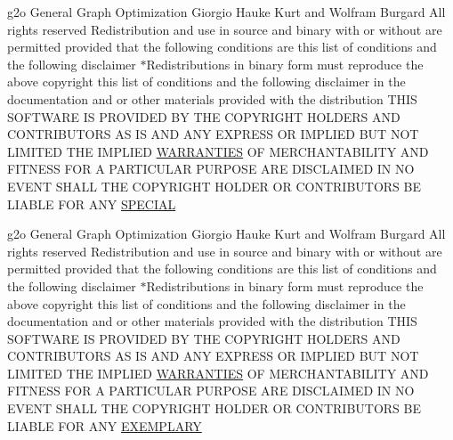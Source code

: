 \begin{DoxyCompactItemize}
g2o General Graph Optimization Giorgio Hauke Kurt and Wolfram Burgard All rights reserved Redistribution and use in source and binary with or without are permitted provided that the following conditions are this list of conditions and the following disclaimer $\ast$Redistributions in binary form must reproduce the above copyright this list of conditions and the following disclaimer in the documentation and or other materials provided with the distribution T\+H\+IS S\+O\+F\+T\+W\+A\+RE IS P\+R\+O\+V\+I\+D\+ED BY T\+HE C\+O\+P\+Y\+R\+I\+G\+HT H\+O\+L\+D\+E\+RS A\+ND C\+O\+N\+T\+R\+I\+B\+U\+T\+O\+RS AS IS A\+ND A\+NY E\+X\+P\+R\+E\+SS OR I\+M\+P\+L\+I\+ED B\+UT N\+OT L\+I\+M\+I\+T\+ED T\+HE I\+M\+P\+L\+I\+ED \hyperlink{license-bsd_8txt_aada97a6c44c9b8b4b0cfb3a641d0fe51}{W\+A\+R\+R\+A\+N\+T\+I\+ES} OF M\+E\+R\+C\+H\+A\+N\+T\+A\+B\+I\+L\+I\+TY A\+ND F\+I\+T\+N\+E\+SS F\+OR A P\+A\+R\+T\+I\+C\+U\+L\+AR P\+U\+R\+P\+O\+SE A\+RE D\+I\+S\+C\+L\+A\+I\+M\+ED IN NO E\+V\+E\+NT S\+H\+A\+LL T\+HE C\+O\+P\+Y\+R\+I\+G\+HT H\+O\+L\+D\+ER OR C\+O\+N\+T\+R\+I\+B\+U\+T\+O\+RS BE L\+I\+A\+B\+LE F\+OR A\+NY \hyperlink{license-bsd_8txt_a325a50f101f6b95e7e5c58bf30a93510}{S\+P\+E\+C\+I\+AL}
\item 
g2o General Graph Optimization Giorgio Hauke Kurt and Wolfram Burgard All rights reserved Redistribution and use in source and binary with or without are permitted provided that the following conditions are this list of conditions and the following disclaimer $\ast$Redistributions in binary form must reproduce the above copyright this list of conditions and the following disclaimer in the documentation and or other materials provided with the distribution T\+H\+IS S\+O\+F\+T\+W\+A\+RE IS P\+R\+O\+V\+I\+D\+ED BY T\+HE C\+O\+P\+Y\+R\+I\+G\+HT H\+O\+L\+D\+E\+RS A\+ND C\+O\+N\+T\+R\+I\+B\+U\+T\+O\+RS AS IS A\+ND A\+NY E\+X\+P\+R\+E\+SS OR I\+M\+P\+L\+I\+ED B\+UT N\+OT L\+I\+M\+I\+T\+ED T\+HE I\+M\+P\+L\+I\+ED \hyperlink{license-bsd_8txt_aada97a6c44c9b8b4b0cfb3a641d0fe51}{W\+A\+R\+R\+A\+N\+T\+I\+ES} OF M\+E\+R\+C\+H\+A\+N\+T\+A\+B\+I\+L\+I\+TY A\+ND F\+I\+T\+N\+E\+SS F\+OR A P\+A\+R\+T\+I\+C\+U\+L\+AR P\+U\+R\+P\+O\+SE A\+RE D\+I\+S\+C\+L\+A\+I\+M\+ED IN NO E\+V\+E\+NT S\+H\+A\+LL T\+HE C\+O\+P\+Y\+R\+I\+G\+HT H\+O\+L\+D\+ER OR C\+O\+N\+T\+R\+I\+B\+U\+T\+O\+RS BE L\+I\+A\+B\+LE F\+OR A\+NY \hyperlink{license-bsd_8txt_af6233a3b2e06f8ce0d28befaf481421d}{E\+X\+E\+M\+P\+L\+A\+RY}
\item 

\end{DoxyCompactItemize}
